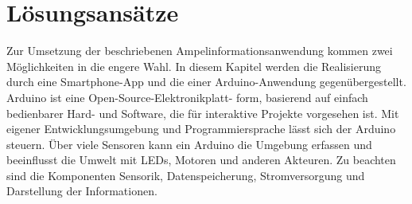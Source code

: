 \chapter{\label{chap:entscheidung}Lösungsansätze}
Zur Umsetzung der beschriebenen Ampelinformationsanwendung kommen zwei Möglichkeiten in die engere Wahl. In diesem Kapitel werden die Realisierung durch eine \gls{Smartphone}-\Gls{App} und die einer \gls{Arduino}-Anwendung gegenübergestellt. 
Arduino ist eine Open-Source-Elektronikplatt- form, basierend auf einfach bedienbarer Hard- und Software, die für interaktive Projekte vorgesehen ist. Mit eigener Entwicklungsumgebung und Programmiersprache lässt sich der Arduino steuern. Über viele Sensoren kann ein Arduino die Umgebung erfassen und beeinflusst die Umwelt mit \glspl{LED}, Motoren und anderen Akteuren. \cite{arduino_about}
Zu beachten sind die Komponenten Sensorik, Datenspeicherung, Stromversorgung und Darstellung der Informationen.\\
